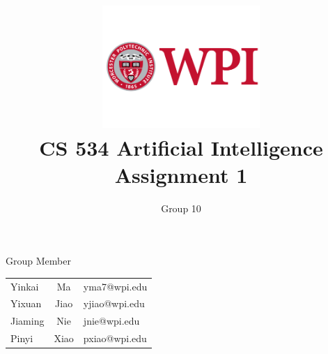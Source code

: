 \documentclass[11pt, a4paper]{article}
\title{\includegraphics[width=0.45\textwidth]{wpi2}
        \\CS 534 Artificial Intelligence \\ Assignment 1 }          %
\author{Group 10 }                    %
\begin{document}
\begin{titlepage}
	
\maketitle
{} %

\begin{center}
Group Member
\end{center}

\begin{table}[htbp] 
\begin{center}
\begin{tabular}{l c l} 

	 Yinkai & Ma  &   yma7@wpi.edu \\
     Yixuan & Jiao  &   yjiao@wpi.edu \\
     Jiaming & Nie  &  jnie@wpi.edu \\
     Pinyi & Xiao  &  pxiao@wpi.edu \\
\end{tabular}
\end{center}
\end{table}



\thispagestyle{empty}  %

\end{titlepage}













  
% 





\end{document}
